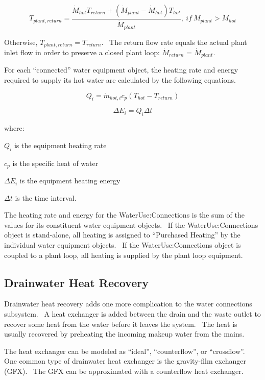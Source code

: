 \begin{equation}
{T_{plant,return}} = \frac{{{{\dot M}_{hot}}{T_{return}} + \left( {{{\dot M}_{plant}} - {{\dot M}_{hot}}} \right){T_{hot}}}}{{{{\dot M}_{plant}}}},~if~{\dot M_{plant}} > {\dot M_{hot}}
\end{equation}

Otherwise, \({T_{plant,return}} = {T_{return}}\).~ The return flow rate equals the actual plant inlet flow in order to preserve a closed plant loop: \({\dot M_{return}}\) = \({\dot M_{plant}}\).

For each ``connected'' water equipment object, the heating rate and energy required to supply its hot water are calculated by the following equations.

\begin{equation}
Q_i = {\dot m_{hot,i}}{c_p}\left( {{T_{hot}} - {T_{return}}} \right)
\end{equation}

\begin{equation}
\Delta E_i = Q_i\Delta t
\end{equation}

where:

\(Q_i\) is the equipment heating rate

\({c_p}\) is the specific heat of water

\(\Delta E_i\) is the equipment heating energy

\(\Delta t\) is the time interval.

The heating rate and energy for the WaterUse:Connections is the sum of the values for its constituent water equipment objects.~ If the WaterUse:Connections object is stand-alone, all heating is assigned to ``Purchased Heating'' by the individual water equipment objects.~ If the WaterUse:Connections object is coupled to a plant loop, all heating is supplied by the plant loop equipment.

\subsection{Drainwater Heat Recovery}\label{drainwater-heat-recovery}

Drainwater heat recovery adds one more complication to the water connections subsystem.~ A heat exchanger is added between the drain and the waste outlet to recover some heat from the water before it leaves the system.~ The heat is usually recovered by preheating the incoming makeup water from the mains.

The heat exchanger can be modeled as ``ideal'', ``counterflow'', or ``crossflow''.~ One common type of drainwater heat exchanger is the gravity-film exchanger (GFX).~ The GFX can be approximated with a counterflow heat exchanger.


